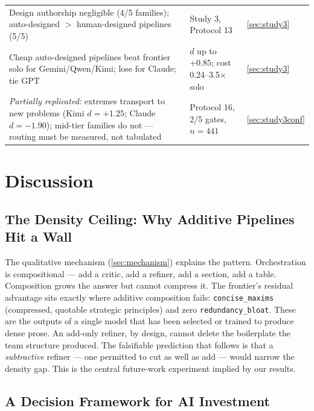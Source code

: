 \documentclass[12pt,a4paper]{article}
\begin{document}
\begin{table}[ht]
\begin{tabular}{@{}>{\raggedright\arraybackslash}p{7.6cm} >{\raggedright\arraybackslash}p{4.6cm} >{\raggedright\arraybackslash}p{2.2cm}@{}}
    Design authorship negligible (4/5 families); auto-designed $>$ human-designed pipelines (5/5) & Study 3, Protocol 13 & \cref{sec:study3} \\
    Cheap auto-designed pipelines beat frontier solo for Gemini/Qwen/Kimi; lose for Claude; tie GPT & $d$ up to $+0.85$; cost 0.24--3.5$\times$ solo & \cref{sec:study3} \\
    \emph{Partially replicated:} extremes transport to new problems (Kimi $d = +1.25$; Claude $d = -1.90$); mid-tier families do not --- routing must be measured, not tabulated & Protocol 16, 2/5 gates, $n = 441$ & \cref{sec:study3conf} \\
    \bottomrule
  \end{tabular}
\end{table}

\section{Discussion}\label{sec:discussion}

\subsection{The Density Ceiling: Why Additive Pipelines Hit a Wall}

The qualitative mechanism (\cref{sec:mechanism}) explains the pattern.
Orchestration is compositional --- add a critic, add a refiner, add a section,
add a table. Composition grows the answer but cannot compress it. The frontier's
residual advantage sits exactly where additive composition fails:
\texttt{concise\_maxims} (compressed, quotable strategic principles) and zero
\texttt{redundancy\_bloat}. These are the outputs of a single model that has
been selected or trained to produce dense prose. An add-only refiner, by design,
cannot delete the boilerplate the team structure produced. The falsifiable
prediction that follows is that a \emph{subtractive} refiner --- one permitted
to cut as well as add --- would narrow the density gap. This is the central
future-work experiment implied by our results.

\subsection{A Decision Framework for AI Investment}\label{sec:decision-framework}
\end{document}
